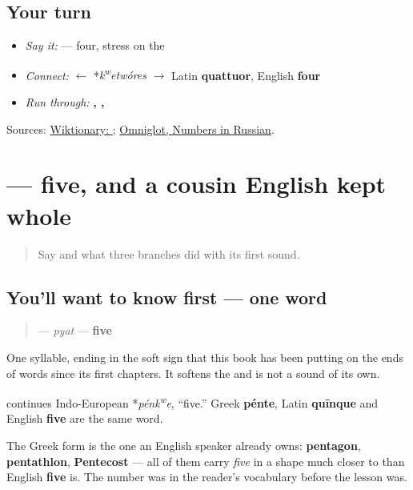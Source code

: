 \subsection*{Your turn}
\begin{itemize}
\raggedright
  \item \emph{Say it:} \textbf{} — four, stress on the \textbf{}
  \item \emph{Connect:} \textbf{} $\leftarrow$ *\emph{k\textsuperscript{w}etwóres} $\to$ Latin \textbf{quattuor}, English \textbf{four}
  \item \emph{Run through:} \textbf{, , }
\end{itemize}

\begin{tcolorbox}[breakable,colback=teal!4,colframe=teal!35!black,title={Before you move on}]
Sources: \href{https://en.wiktionary.org/wiki/\%D1\%87\%D0\%B5\%D1\%82\%D1\%8B\%D1\%80\%D0\%B5}{Wiktionary: }; \href{https://www.omniglot.com/language/numbers/russian.htm}{Omniglot, Numbers in Russian}.
\end{tcolorbox}
\section[\texorpdfstring{\ru{пять} (pyat)}{пять (pyat)}]{ — five, and a cousin English kept whole}

\label{lesson:RU-C23-pyat}



\begin{quote}
Say \textbf{} and what three branches did with its first sound.
\end{quote}

\subsection*{You'll want to know first — one word}
\begin{quote}
\textbf{} — \emph{pyat} — \textbf{five}
\end{quote}

One syllable, ending in the soft sign that this book has been putting on the ends of words since its first chapters. It softens the \textbf{} and is not a sound of its own.

\begin{cousinweb}
\textbf{} continues Indo-European *\emph{pénk\textsuperscript{w}e}, \textquotedblleft{}five.\textquotedblright{} Greek \textbf{pénte}, Latin \textbf{quīnque} and English \textbf{five} are the same word.

The Greek form is the one an English speaker already owns: \textbf{pentagon}, \textbf{pentathlon}, \textbf{Pentecost} — all of them carry \emph{five} in a shape much closer to \textbf{} than English \textbf{five} is. The number was in the reader's vocabulary before the lesson was.
\end{cousinweb}

